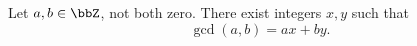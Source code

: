 \begin{proposition} \label{proposition:bezout_identity_for_gcd_of_integers}
    Let $a, b \in \bbZ$, not both zero. There exist integers $x, y$ such that
    $$\gcd(a, b) = ax + by.$$
\end{proposition}
